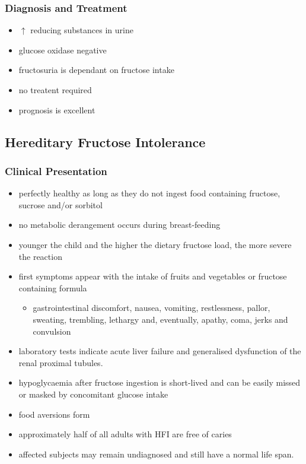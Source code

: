 \documentclass{scrartcl}
\begin{document}
\subsubsection{Diagnosis and Treatment}
\label{sec:orge341eb5}
\begin{itemize}
\item \(\uparrow\) reducing substances in urine
\item glucose oxidase negative
\item fructosuria is dependant on fructose intake
\item no treatent required
\item prognosis is excellent
\end{itemize}

\subsection{Hereditary Fructose Intolerance}
\label{sec:org2c21e9b}
\subsubsection{Clinical Presentation}
\label{sec:org49fbb3a}
\begin{itemize}
\item perfectly healthy as long as they do not ingest food containing fructose, sucrose and/or sorbitol
\item no metabolic derangement occurs during breast-feeding
\item younger the child and the higher the dietary fructose load, the more severe the reaction
\item first symptoms appear with the intake of fruits and vegetables or fructose containing formula
\begin{itemize}
\item gastrointestinal discomfort, nausea, vomiting, restlessness,
pallor, sweating, trembling, lethargy and, eventually, apathy,
coma, jerks and convulsion
\end{itemize}
\item laboratory tests indicate acute liver failure and generalised dysfunction of the renal proximal tubules.
\item hypoglycaemia after fructose ingestion is short-lived and can be easily missed or masked by concomitant glucose intake
\item food aversions form
\item approximately half of all adults with HFI are free of caries
\item affected subjects may remain undiagnosed and still have a normal life span.
\end{itemize}
\end{document}
